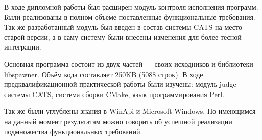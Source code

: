 \documentclass{imcs}
\begin{document}
В ходе дипломной работы был расширен модуль контроля исполнения программ. Были реализованы в полном объеме поставленные функциональные требования.
Так же разработанный модуль был введен в состав системы CATS на место старой версии, а в саму систему были внесены изменения для более тесной интеграции. 

Основная программа состоит из двух частей — своих исходников и библиотеки libspawner. Объём кода составляет 250KB (5088 строк).
В ходе предквалификационной практической работы были изучены: модуль judge системы CATS, система сборки CMake, язык программирования Perl.

Так же были углублены знания в WinApi и Microsoft Windows.
По имеющимся на данный момент результатам можно говорить об успешной реализации подмножества функциональных требований.

\pagebreak
\end{document}
